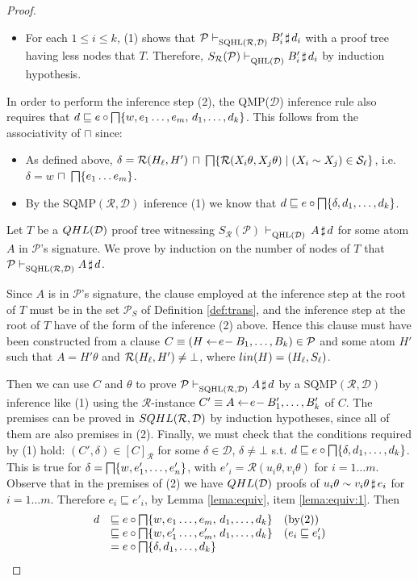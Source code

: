 \documentclass{sigplanconf}
\newcommand{\qdom}{\mathcal{D}} \newcommand{\dqdom}{D \setminus \{\bot\}} \newcommand{\bqdom}{(D \setminus \{\bot\}) \uplus \{?\}}
\newcommand{\Set}{\mathcal{S}}
\newcommand{\simrel}{\mathcal{R}}
\newcommand{\trans}[2]{S_{#1}(#2)}
\newcommand{\Prog}{\mathcal{P}} \newcommand{\UProg}{\mathcal{P_U}}
\theoremstyle{definition}
\theoremstyle{plain}
\begin{document}
\begin{proof}
\begin{itemize}
    \item For each $1 \le i \le k$, (1) shows that $\Prog \sqhlrd \at{B'_i}{d_i}$ with a proof tree having less nodes that $T$. Therefore, $\trans{\simrel}{\Prog} \qhld \at{B'_i}{d_i}$ by induction hypothesis.
\end{itemize}

In order to perform the inference step (2), the QMP($\qdom$) inference rule also requires that $d \sqsubseteq e \circ \bigsqcap \{w, e_1 \dots, e_m, \, d_1, \ldots, d_k\}$. This follows from the associativity of $\sqcap$ since:
\begin{itemize}
    \item As defined above, $\delta = \simrel(\linear{H}, H')$ $\sqcap~ \infi\{\simrel(X_i\theta, X_j\theta) \mid (X_i \sim X_j) \in \linear{\Set}\}$, i.e. $\delta = w$ $\sqcap~ \bigsqcap\{e_1 \dots e_m \}$.
    \item By the $\mbox{SQMP}(\simrel,\qdom)$  inference (1) we know that $d \sqsubseteq e \circ \bigsqcap \{\delta, d_1, \ldots, d_k\}$.
\end{itemize}
\medskip

Let $T$ be a $\qhl{\qdom}$ proof tree witnessing $\trans{\simrel}{\Prog}$ $\qhld$ $A\,\sharp\,d$ for some atom $A$ in $\Prog$'s signature.  We prove by induction on the number of nodes of $T$ that ${\Prog} \sqhlrd \at{A}{d}$.

Since $A$ is in $\Prog$'s signature, the clause employed at the inference step at the root of $T$ must be in the set $\Prog_S$ of Definition \ref{def:trans}, and the inference step at the root of $T$ have of the form of the inference (2) above. Hence this clause must have been constructed from a clause $C \equiv (H \qgets{e} B_1, \ldots, B_k) \in \Prog$ and some atom $H'$ such that $A = H'\theta$ and $\simrel(\linear{H},H') \neq \bot$, where $lin(H)=(H_\ell, S_\ell)$.

Then we can use $C$ and $\theta$ to prove ${\Prog} \sqhlrd \at{A}{d}$ by  a $\mbox{SQMP}(\simrel,\qdom)$ inference like (1) using the $\simrel$-instance $C' \equiv A \gets\!e\!- B'_1, \dots, B'_k$ of $C$. The premises can be proved in $\sqhl{\simrel}{\qdom}$ by induction hypotheses, since all of them are also premises in (2). Finally, we must check that the conditions required by (1) hold:  $(C', \delta) \in [C]_\simrel$ for some $\delta \in \qdom$, $\delta \neq \bot$ s.t. $d \sqsubseteq e \circ \bigsqcap \{\delta, d_1, \ldots, d_k\}$. This is true for $\delta = \bigsqcap \{w, e'_1, \dots, e'_n\}$, with $e'_i=\simrel(u_i\theta,v_i\theta)$ for $i=1 \dots m$. Observe that in the premises of (2) we have $\qhl{\qdom}$ proofs of $u_i\theta \sim v_i\theta\,\sharp\,e_i$ for $i=1 \dots m$. Therefore $e_i \sqsubseteq e'_i$, by Lemma \ref{lema:equiv}, item \ref{lema:equiv:1}. Then
$$
\begin{array}{lll}
d & \sqsubseteq e \circ \bigsqcap \{w, e_1 \dots, e_m, \, d_1, \ldots,
d_k\} & \mathrm{(by (2))} \\
  & \sqsubseteq e \circ \bigsqcap \{w, e'_1 \dots, e'_m, \, d_1, \ldots,
d_k\} & (e_i \sqsubseteq e'_i)\\
  & = e \circ \bigsqcap \{\delta,d_1, \ldots, d_k\}
\end{array}
$$


\end{proof}
\end{document}
